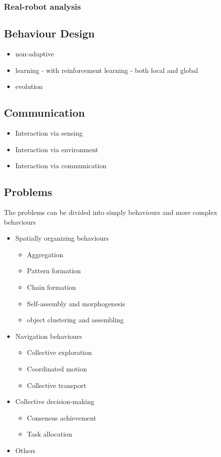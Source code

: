 \subsubsection{Real-robot analysis}

\subsection{Behaviour Design}

\begin{itemize}
	\item non-adaptive
	\item learning - with reinforcement learning - both local and global
	\item evolution
\end{itemize}

\subsection{Communication}

\begin{itemize}
	\item Interaction via sensing
	\item Interaction via environment
	\item Interaction via communication
\end{itemize}

\subsection{Problems}
\label{swarmrobotapplications}

The problems can be divided into simply behaviours and more complex behaviours

\begin{itemize}
	\item Spatially organizing behaviours
		\begin{itemize}
			\item Aggregation
			\item Pattern formation
			\item Chain formation
			\item Self-assembly and morphogenesis
			\item object clustering and assembling
		\end{itemize}
	\item Navigation behaviours
		\begin{itemize}
			\item Collective exploration
			\item Coordinated motion
			\item Collective transport
		\end{itemize}
	\item Collective decision-making
		\begin{itemize}
			\item Consensus achievement
			\item Task allocation
		\end{itemize}
	\item Others
\end{itemize}

